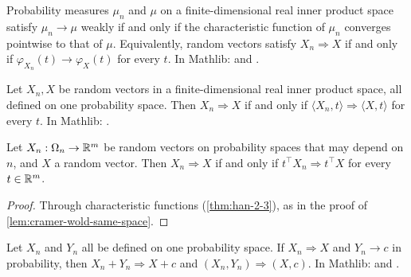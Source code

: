\begin{theorem}
  \label{thm:han-2-3}
  \mathlibok
  Probability measures $\mu_n$ and $\mu$ on a finite-dimensional real inner product space satisfy $\mu_n\to\mu$ weakly if and only if the characteristic function of $\mu_n$ converges pointwise to that of $\mu$. Equivalently, random vectors satisfy $X_n\Rightarrow X$ if and only if $\varphi_{X_n}(t)\to\varphi_X(t)$ for every $t$.
  In Mathlib:  and .
\end{theorem}

\begin{lemma}
  \label{lem:cramer-wold-same-space}
  \mathlibok
  Let $X_n,X$ be random vectors in a finite-dimensional real inner product space, all defined on one probability space. Then $X_n\Rightarrow X$ if and only if $\langle X_n,t\rangle\Rightarrow\langle X,t\rangle$ for every $t$.
  In Mathlib: .
\end{lemma}

\begin{corollary}
  \label{cor:han-2-1}
  Let $X_n:\Omega_n\to\mathbb{R}^m$ be random vectors on probability spaces that may depend on $n$, and $X$ a random vector. Then $X_n\Rightarrow X$ if and only if $t^\top X_n\Rightarrow t^\top X$ for every $t\in\mathbb{R}^m$.
\end{corollary}
\begin{proof}
  Through characteristic functions (\cref{thm:han-2-3}), as in the proof of \cref{lem:cramer-wold-same-space}.
\end{proof}

\begin{lemma}
  \label{lem:slutsky}
  \mathlibok
  Let $X_n$ and $Y_n$ all be defined on one probability space. If $X_n\Rightarrow X$ and $Y_n\to c$ in probability, then $X_n+Y_n\Rightarrow X+c$ and $(X_n,Y_n)\Rightarrow(X,c)$.
  In Mathlib:  and .
\end{lemma}

